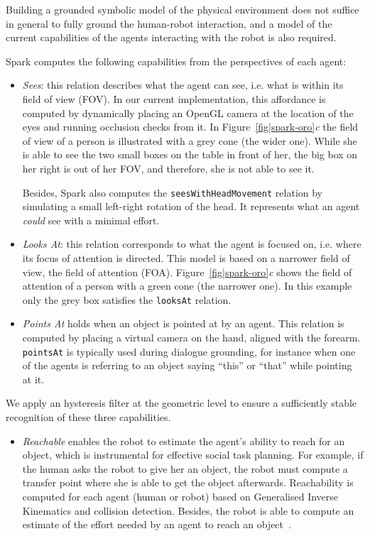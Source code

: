 \documentclass[preprint,3p,times]{elsarticle}
\newcommand{\concept}[1]{{\small \texttt{#1}}}
\newcommand{\ie}{i.e.\xspace}
\begin{document}
Building a grounded symbolic model of the physical environment does not suffice
in general to fully ground the human-robot interaction, and a model of the
current capabilities of the agents interacting with the robot is also required.

{\sc Spark} computes the following capabilities from the perspectives of each agent:

\begin{itemize}

\item \emph{Sees}: this relation describes what the agent can see, \ie what is
    within its field of view (FOV). In our current implementation, this
    affordance is computed by dynamically placing an OpenGL camera at the
    location of the eyes and running occlusion checks from it.  In
    Figure~\ref{fig|spark-oro}\emph{c} the field of view of a person is
    illustrated with a grey cone (the wider one). While she is able to see the two
    small boxes on the table in front of her, the big box on her right is out of
    her FOV, and therefore, she is not able to see it. 

    Besides, {\sc Spark} also computes the \concept{seesWithHeadMovement}
    relation by simulating a small left-right rotation of the head. It
    represents what an agent \emph{could} see with a minimal effort.
    

\item \emph{Looks At}: this relation corresponds to what the agent is focused
    on, \ie where its focus of attention is directed. This model is based on a
    narrower field of view, the field of attention (FOA).
    Figure~\ref{fig|spark-oro}\emph{c} shows the field of attention
    of a person with a green cone (the narrower one). In this example only the grey
    box satisfies the \concept{looksAt} relation.


\item \emph{Points At} holds when an object is pointed at by an agent.
    This relation is computed by placing a virtual camera on the hand, aligned
    with the forearm. \concept{pointsAt} is typically used during dialogue
    grounding, for instance when one of the agents is referring to an object
    saying ``this'' or ``that'' while pointing at it.
\end{itemize}

We apply an hysteresis filter at the geometric level to ensure a sufficiently
stable recognition of these three capabilities.

\begin{itemize}
\item \emph{Reachable} enables the robot to estimate the agent's ability to
    reach for an object, which is instrumental for effective social task
    planning. For example, if the human asks the robot to give her an object,
    the robot must compute a transfer point where she is able to get the
    object afterwards.  Reachability is computed for each agent (human or robot) based on
    Generalised Inverse Kinematics and collision detection. Besides, the robot is able 
    to compute an estimate of the effort needed by an agent to reach an object~\cite{pandey2013affordance}.

\end{itemize}
\end{document}
